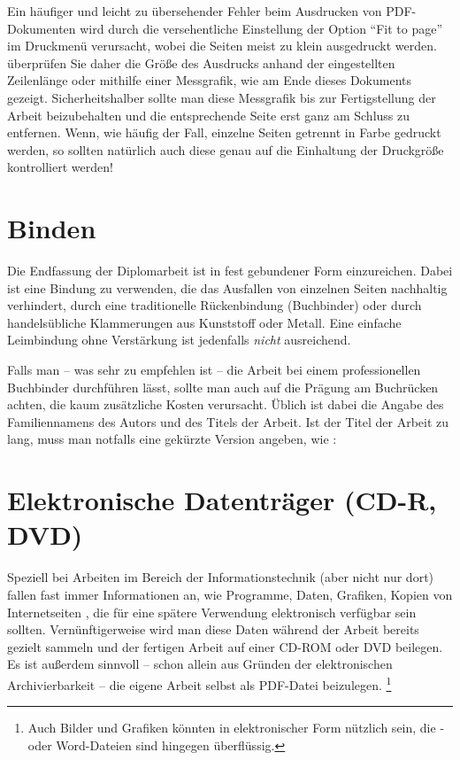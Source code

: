 Ein häufiger und leicht zu übersehender Fehler beim Ausdrucken von
PDF-Dokumenten wird durch die versehentliche Einstellung der
Option "`Fit to page"' im Druckmenü verursacht, wobei die Seiten
meist zu klein ausgedruckt werden. überprüfen Sie daher die Größe
des Ausdrucks anhand der eingestellten Zeilenlänge oder mithilfe
einer Messgrafik, wie am Ende dieses Dokuments gezeigt.
Sicherheitshalber sollte man diese Messgrafik bis zur
Fertigstellung der Arbeit beizubehalten und die entsprechende
Seite erst ganz am Schluss zu entfernen.
Wenn, wie häufig der Fall, einzelne Seiten getrennt in Farbe gedruckt 
werden, so sollten natürlich auch diese genau auf die Einhaltung der Druckgröße 
kontrolliert werden!




\section{Binden}

Die Endfassung der Diplomarbeit ist in fest gebundener Form einzureichen.%
Dabei ist eine Bindung zu verwenden, die das Ausfallen von einzelnen Seiten
nachhaltig verhindert, \zB durch eine traditionelle Rückenbindung
(Buchbinder) oder durch handelsübliche Klammerungen aus Kunststoff
oder Metall. Eine einfache Leimbindung ohne Verstärkung ist
jedenfalls \emph{nicht} ausreichend.


Falls man -- was sehr zu empfehlen ist -- die Arbeit bei einem
professionellen Buchbinder durchführen lässt, sollte man auch auf
die Prägung am Buchrücken achten, die kaum zusätzliche Kosten
verursacht. Üblich ist dabei die Angabe des Familiennamens des
Autors und des Titels der Arbeit. Ist der Titel der Arbeit zu
lang, muss man notfalls eine gekürzte  Version angeben, wie \zB:
%
\begin{center}
\setlength{\fboxsep}{3mm}
\end{center}
%



\section{Elektronische Datenträger (CD-R, DVD)}
Speziell bei Arbeiten im Bereich der Informationstechnik (aber
nicht nur dort) fallen fast immer Informationen an, wie Programme,
Daten, Grafiken, Kopien von Internetseiten \usw, die für eine
spätere Verwendung elektronisch verfügbar sein sollten.
Vernünftigerweise wird man diese Daten während der Arbeit bereits
gezielt sammeln und der fertigen Arbeit auf einer CD-ROM oder DVD
beilegen. Es ist außerdem sinnvoll -- schon allein aus Gründen der
elektronischen Archivierbarkeit -- die eigene Arbeit selbst als
PDF-Datei beizulegen.%
\footnote{Auch Bilder und Grafiken könnten in elektronischer Form nützlich
sein, die \latex- oder Word-Dateien sind hingegen überflüssig.}


